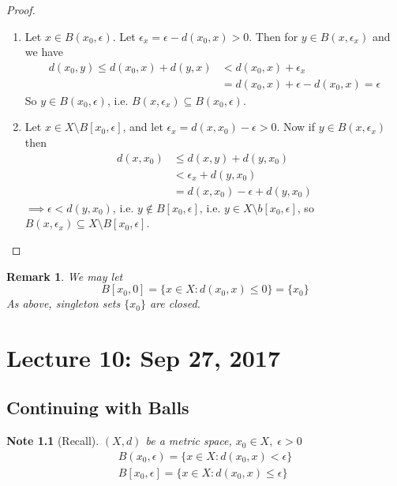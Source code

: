 \documentclass[11pt, oneside]{book}
\theoremstyle{break}
\newtheorem*{proof}{Proof}
\newtheorem*{remark}{Remark}
\newtheorem*{note}{Note}
\begin{document}
\begin{proof}
	\begin{enumerate}
		\item Let $x \in B(x_0, \epsilon)$. Let $\epsilon_x = \epsilon - d(x_0, x) > 0$. Then for $y \in B(x, \epsilon_x)$ and we have
			\begin{align*}
				d(x_0, y) \leq d(x_0, x) + d(y, x) &< d(x_0, x) + \epsilon_x \\
						&= d(x_0, x) + \epsilon - d(x_0, x) = \epsilon
			\end{align*}
			So $y \in B(x_0, \epsilon)$, i.e. $B(x, \epsilon_x) \subseteq B(x_0, \epsilon)$.

		\item Let $x \in X \setminus B[x_0, \epsilon]$, and let $\epsilon_x = d(x, x_0) - \epsilon > 0$. Now if $y \in B(x, \epsilon_x)$ then
			\begin{align*}
				d(x, x_0) &\leq d(x,y) + d(y, x_0) \\
					&< \epsilon_x + d(y, x_0) \\
					&= d(x, x_0) - \epsilon + d(y, x_0)
			\end{align*}
			$\implies \epsilon < d(y, x_0)$, i.e. $y \notin B[x_0, \epsilon]$, i.e. $y \in X \setminus b[x_0, \epsilon]$, so $B(x, \epsilon_x) \subseteq X \setminus B[x_0, \epsilon]$.
	\end{enumerate}
\end{proof}

\begin{remark}
	We may let
	\begin{equation}
		B[x_0, 0] = \{x \in X : d(x_0, x) \leq 0 \} = \{x_0\}
	\end{equation}
	As above, singleton sets $\{x_0\}$ are closed.
\end{remark}

\chapter{Lecture 10: Sep 27, 2017}\label{chp:lec10}

\section{Continuing with Balls}\label{sect:balls cont}

\begin{note}[Recall]
	$(X, d)$ be a metric space, $x_0 \in X, \; \epsilon > 0$
	\begin{gather*}
		B(x_0, \epsilon) = \{x \in X : d(x_0, x) < \epsilon \} \\
		B[x_0, \epsilon] = \{x \in X : d(x_0, x) \leq \epsilon \}
	\end{gather*}
\end{note}
\end{document}
